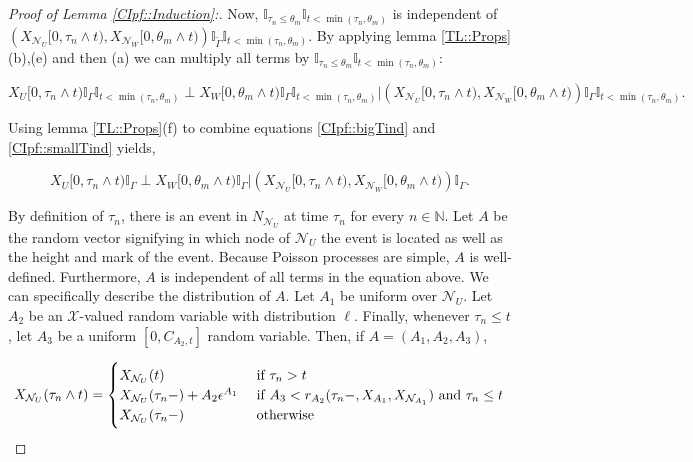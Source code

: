 \documentclass[12pt]{article}
\newcommand{\mb}{\mathbb}
\newcommand{\mc}{\mathcal}
\newcommand{\te}{\text}
\newcommand{\ep}{\epsilon}
\newcommand{\sta}{\mc{X}}							%
\newcommand{\neigh}[1]{\mc{N}_{#1}}					%
\newcommand{\Xf}{X}									%
\newcommand{\poiss}{N}								%
\newcommand{\Sm}{\ell}								%
\newcommand{\rate}{r}								%
\newcommand{\poissv}[1]{_{#1}}						%
\newcommand{\vind}[1]{_{#1}}						%
\newcommand{\tme}[1]{(#1)}							%
\newcommand{\tmi}[1]{#1}							%
\newcommand{\stpara}[1]{_{#1}}						%
\newcommand{\jumpibd}[2]{C_{#1,#2}}					%
\newcommand{\tmepro}[3]{
\ifstrempty{#3}{
	(#1,#2)}{
	(#1,#2,#3)}}									%
\newcommand{\seto}{U}								%
\newcommand{\sett}{W}								%
\newcommand{\rtt}{\theta}							%
\newcommand{\apath}{\Gamma}						%
\newcommand{\rv}{A}								%
\newcommand{\indo}{n}							%
\newcommand{\indt}{m}							%
\newcommand{\alt}[1]{\tilde{#1}}					%
\newcommand{\rt}{\tau}								%
\newcommand{\ev}[1]{\ep^{#1}}						%
\renewcommand{\it}[1]{_{#1}}						%
\begin{document}
\begin{proof}[Proof of Lemma \ref{CIpf::Induction}:]
Now, \(\mb{I}_{\rt\it{\indo} \leq \rtt\it{\indt}}\mb{I}_{t < \min(\rt\it{\indo},\rtt\it{\indt})}\) is independent of \(\left(\Xf\vind{\neigh{\seto}}\tmi{[0,\rt\it{\indo}\wedge t)},\Xf\vind{\neigh{\sett}}\tmi{[0,\rtt\it{\indt}\wedge t)}\right)\mb{I}_{\alt{\apath}}\mb{I}_{t < \min(\rt\it{\indo},\rtt\it{\indt})}\). By applying lemma \ref{TL::Props} (b),(e) and then (a) we can multiply all terms by \(\mb{I}_{\rt\it{\indo} \leq \rtt\it{\indt}}\mb{I}_{t < \min(\rt\it{\indo},\rtt\it{\indt})}\):

\begin{equation}
\Xf\vind{\seto}\tmi{[0,\rt\it{\indo}\wedge t)}\mb{I}_{\apath}\mb{I}_{t < \min(\rt\it{\indo},\rtt\it{\indt})}\perp \Xf\vind{\sett}\tmi{[0,\rtt\it{\indt}\wedge t)}\mb{I}_{\apath}\mb{I}_{t < \min(\rt\it{\indo},\rtt\it{\indt})}|\left(\Xf\vind{\neigh{\seto}}\tmi{[0,\rt\it{\indo}\wedge t)},\Xf\vind{\neigh{\sett}}\tmi{[0,\rtt\it{\indt}\wedge t)}\right)\mb{I}_{\apath}\mb{I}_{t < \min(\rt\it{\indo},\rtt\it{\indt})}.
\label{CIpf::smallTind}
\end{equation}

Using lemma \ref{TL::Props}(f) to combine equations \eqref{CIpf::bigTind} and \eqref{CIpf::smallTind} yields,

\[\Xf\vind{\seto}\tmi{[0,\rt\it{\indo}\wedge t)}\mb{I}_{\apath}\perp \Xf\vind{\sett}\tmi{[0,\rtt\it{\indt}\wedge t)}\mb{I}_{\apath}|\left(\Xf\vind{\neigh{\seto}}\tmi{[0,\rt\it{\indo}\wedge t)},\Xf\vind{\neigh{\sett}}\tmi{[0,\rtt\it{\indt}\wedge t)}\right)\mb{I}_{\apath}.\]

By definition of \(\rt\it{\indo}\), there is an event in \(\poiss\poissv{\neigh{\seto}}\) at time \(\rt\it{\indo}\) for every \(\indo \in \mb{ N}\). Let \(\rv\) be the random vector signifying in which node of \(\neigh{\seto}\) the event is located as well as the height and mark of the event. Because Poisson processes are simple, \(\rv\) is well-defined. Furthermore, \(\rv\) is independent of all terms in the equation above. We can specifically describe the distribution of \(\rv\). Let \(\rv\vind{1}\) be uniform over \(\neigh{\seto}\). Let \(\rv\vind{2}\) be an \(\sta\)-valued random variable with distribution \(\Sm\). Finally, whenever \(\rt\it{\indo} \leq t\), let \(\rv\vind{3}\) be a uniform \([0,\jumpibd{\rv\vind{2}}{t}]\) random variable. Then, if \(\rv=(\rv\vind{1},\rv\vind{2},\rv\vind{3})\),

\[\Xf\vind{\neigh{\seto}}\tme{\rt\it{\indo}\wedge t} = \begin{cases}
\Xf\vind{\neigh{\seto}}\tme{t} &\te{ if } \rt\it{\indo} > t\\
\Xf\vind{\neigh{\seto}}\tme{\rt\it{\indo}-} + \rv\vind{2}\ev{\rv\vind{1}} &\te{ if } \rv\vind{3}< \rate\stpara{\rv\vind{2}}\tmepro{\rt\it{\indo}-}{\Xf\vind{\rv\vind{1}}}{\Xf\vind{\neigh{\rv\vind{1}}}}\te{ and } \rt\it{\indo} \leq t\\
\Xf\vind{\neigh{\seto}}\tme{\rt\it{\indo}-} &\te{ otherwise}
\end{cases}\]


\end{proof}
\end{document}
